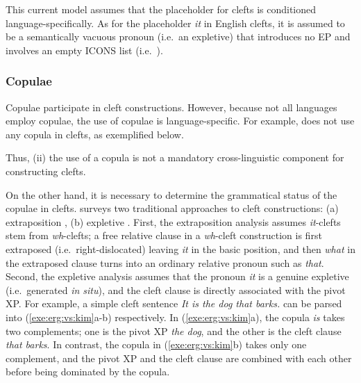 \noindent This current model assumes that the placeholder for clefts is
conditioned language-specifically. As for the placeholder \textit{it}
in English clefts, it is assumed to be a semantically vacuous pronoun
(i.e.\ an expletive) that introduces no EP and involves an empty ICONS
list (i.e.\ ).


\subsubsection{Copulae}
\label{10:sssec:clefts:cop}


Copulae participate in cleft constructions. However, because not all
languages employ copulae, the use of copulae is language-specific. For
example,  does not use any copula in clefts, as
exemplified below.



\noindent Thus, (ii) the use of a copula is not a mandatory
cross-linguistic component for constructing clefts.


On the other hand, it is necessary to determine the grammatical status
of the copulae in clefts. \citet{kim:12a} surveys two
traditional approaches to cleft constructions: (a) extraposition
\citep{gundel:77}, (b) expletive \citep{kiss:99,lambrecht:01}.  First,
the extraposition analysis assumes \textit{it}-clefts stem from
\textit{wh}-clefts; a free relative clause in a
\textit{wh}-cleft construction is first extraposed
(i.e.\ right-dislocated) leaving \textit{it} in the basic position,
and then \textit{what} in the extraposed clause turns into an ordinary
relative pronoun such as \textit{that}.  Second, the expletive
analysis assumes that the pronoun \textit{it} is a genuine expletive
(i.e.\ generated \textit{in situ}), and the cleft clause is directly
associated with the pivot XP. For example, a simple cleft sentence
\textit{It is the dog that barks.}  can be parsed into
(\ref{exe:erg:vs:kim}a-b) respectively. In (\ref{exe:erg:vs:kim}a),
the copula \textit{is} takes two complements; one is the pivot XP
\textit{the dog}, and the other is the cleft clause \textit{that
  barks}. In contrast, the copula in (\ref{exe:erg:vs:kim}b) takes
only one complement, and the pivot XP and the cleft clause are
combined with each other before being dominated by the copula.


